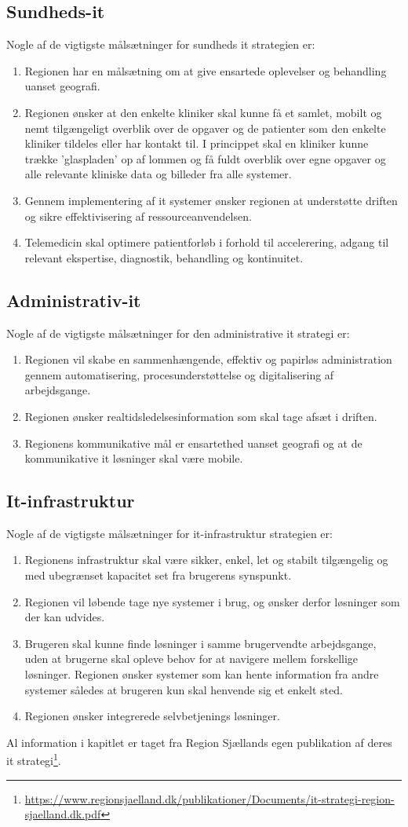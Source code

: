 \subsection{Sundheds-it}
Nogle af de vigtigste målsætninger for sundheds it strategien er:
\begin{enumerate}
	\item Regionen har en målsætning om at give ensartede oplevelser og behandling uanset geografi.
	\item Regionen ønsker at den enkelte kliniker skal kunne få et samlet, mobilt og nemt tilgængeligt overblik over de opgaver og de patienter som den enkelte kliniker tildeles eller har kontakt til. I princippet skal en kliniker kunne
	trække 'glaspladen' op af lommen og få fuldt overblik over egne opgaver og alle relevante kliniske data og billeder fra alle systemer.
	\item Gennem implementering af it systemer ønsker regionen at understøtte driften og sikre effektivisering af ressourceanvendelsen.
	\item Telemedicin skal optimere patientforløb i forhold til accelerering, adgang til relevant ekspertise, diagnostik, behandling og kontinuitet. 
\end{enumerate}
\subsection{Administrativ-it}
Nogle af de vigtigste målsætninger for den administrative it strategi er:
\begin{enumerate}
	\item Regionen vil skabe en sammenhængende, effektiv og papirløs administration gennem automatisering, procesunderstøttelse og digitalisering af arbejdsgange.
	\item Regionen ønsker realtidsledelsesinformation som skal tage afsæt i driften.
	\item Regionens kommunikative mål er ensartethed uanset geografi og at de kommunikative it løsninger skal være mobile.
\end{enumerate}
\subsection{It-infrastruktur}
Nogle af de vigtigste målsætninger for it-infrastruktur strategien er:
\begin{enumerate}
	\item Regionens infrastruktur skal være sikker, enkel, let og stabilt tilgængelig og med ubegrænset kapacitet set fra brugerens synspunkt.
	\item Regionen vil løbende tage nye systemer i brug, og ønsker derfor løsninger som der kan udvides.
	\item Brugeren skal kunne finde løsninger i samme brugervendte arbejdsgange, uden at brugerne skal opleve behov for at navigere mellem forskellige løsninger. Regionen ønsker systemer som kan hente information fra andre systemer således at brugeren kun skal henvende sig et enkelt sted.
	\item Regionen ønsker integrerede selvbetjenings løsninger.
\end{enumerate}


Al information i kapitlet er taget fra Region Sjællands egen publikation af deres it strategi\footnote{\url{https://www.regionsjaelland.dk/publikationer/Documents/it-strategi-region-sjaelland.dk.pdf}}.